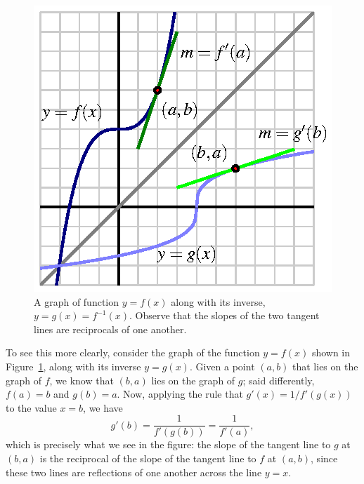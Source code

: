 \begin{figure}[h]
\begin{center}
\includegraphics{figures/2_6_GenInv.eps}
\caption{A graph of function $y = f(x)$ along with its inverse, $y = g(x) = f^{-1}(x)$.  Observe that the slopes of the two tangent lines are reciprocals of one another.} \label{F:2.6.GenInv}
\end{center}
\end{figure}

To see this more clearly, consider the graph of the function $y = f(x)$ shown in Figure~\ref{F:2.6.GenInv}, along with its inverse $y = g(x)$.  Given a point $(a,b)$ that lies on the graph of $f$, we know that $(b,a)$ lies on the graph of $g$; said differently, $f(a) = b$ and $g(b) = a$.  Now, applying the rule that $g'(x) = 1/f'(g(x))$ to the value $x = b$, we have 
$$g'(b) = \frac{1}{f'(g(b))} = \frac{1}{f'(a)},$$
which is precisely what we see in the figure:  the slope of the tangent line to $g$ at $(b,a)$ is the reciprocal of the slope of the tangent line to $f$ at $(a,b)$, since these two lines are reflections of one another across the line $y = x$.

\vspace*{5pt}
\nin {}
\vspace*{1pt}

